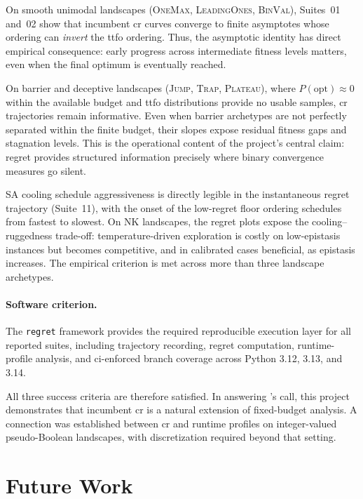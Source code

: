 On smooth unimodal landscapes (\textsc{OneMax}, \textsc{LeadingOnes},
\textsc{BinVal}), Suites~01 and~02 show that incumbent \acrshort{cr}
curves converge to finite asymptotes whose ordering can \textit{invert}
the \acrshort{ttfo} ordering. Thus, the asymptotic identity has direct
empirical consequence: early progress across intermediate fitness
levels matters, even when the final optimum is eventually reached.

On barrier and deceptive landscapes (\textsc{Jump}, \textsc{Trap},
\textsc{Plateau}), where $P(\text{opt}) \approx 0$ within the
available budget and \acrshort{ttfo} distributions provide no usable
samples, \acrshort{cr} trajectories remain informative. Even when
barrier archetypes are not perfectly separated within the finite
budget, their slopes expose residual fitness gaps and stagnation
levels. This is the operational content of the project's central claim:
regret provides structured information precisely where binary
convergence measures go silent.

SA cooling schedule aggressiveness is directly legible in the
instantaneous regret trajectory (Suite~11), with the onset of the
low-regret floor ordering schedules from fastest to slowest. On NK
landscapes, the regret plots expose the cooling--ruggedness trade-off:
temperature-driven exploration is costly on low-epistasis instances but
becomes competitive, and in calibrated cases beneficial, as epistasis
increases. The empirical criterion is met across more than three
landscape archetypes.

\paragraph{Software criterion.}
The \texttt{regret} framework provides the required reproducible
execution layer for all reported suites, including trajectory
recording, regret computation, runtime-profile analysis, and
\acrfull{ci}-enforced branch coverage across Python 3.12, 3.13, and
3.14.

All three success criteria are therefore satisfied. In answering
\citet{pinto2018practice}'s call, this project demonstrates that
incumbent \acrshort{cr} is a natural extension of fixed-budget
analysis. A connection was established between \acrshort{cr}
and runtime profiles on integer-valued pseudo-Boolean landscapes, with
discretization required beyond that setting.

\section{Future Work}

